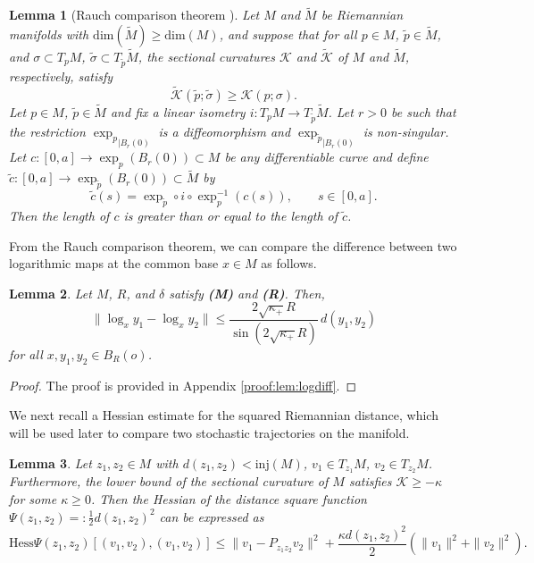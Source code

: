 \documentclass[11pt]{amsart}
\newtheorem{lemma}{Lemma}[section]
\newcommand{\p}{o}%
\newcommand{\dist}{d}%
\newcommand{\inj}{\mathrm{inj}}%
\newcommand{\secc}{\mathcal{K}}%
\begin{document}
\begin{lemma}[Rauch comparison theorem \cite{cheeger1975comparison}]\label{RCT}
Let $M$ and $\tilde{M}$ be Riemannian manifolds with $\mathrm{dim} (\tilde{M})\geq \mathrm{dim}(M)$, and suppose that for all $p\in M$, $\tilde{p}\in \tilde{M}$, and $\sigma\subset T_pM$, $\tilde{\sigma}\subset T_{\tilde{p}}\tilde{M}$, the sectional curvatures $\secc$ and $\tilde{\secc}$ of $M$ and $\tilde{M}$, respectively, satisfy
\[
\tilde{\secc} (\tilde{p};\tilde{\sigma})\geq \secc(p;\sigma).
\]
Let $p\in M$, $\tilde{p}\in\tilde{M}$ and fix a linear isometry $i:T_pM\to T_{\tilde{p}}\tilde{M}$. Let $r>0$ be such that the restriction ${\exp_p}_{|B_r(0)}$ is a diffeomorphism and ${\exp_{\tilde{p}}}_{|B_r(0)}$ is non-singular. Let $c:[0, a]\to\exp_p(B_r(0))\subset M$ be any differentiable curve and define  $\tilde{c}:[0, a]\to\exp_{\tilde{p}}(B_r(0))\subset\tilde{M}$ by
\[
\tilde{c}(s)=\exp_{\tilde{p}}\circ i\circ\exp^{-1}_p(c(s)),\qquad s\in[0, a].
\]  
Then the length of $c$ is greater than or equal to the length of $\tilde{c}$.
\end{lemma}


From the Rauch comparison theorem, we can compare the difference between two logarithmic maps at the common base $x\in M$ as follows.


\begin{lemma}\label{lem:logdiff}
Let $M$, $R$, and $\delta$ satisfy \textbf{(M)} and \textbf{(R)}. Then,
\[
\|\log_x y_1-\log_x y_2\|
\le
\frac{2\sqrt{\kappa_+}R}{\sin(2\sqrt{\kappa_+}R)}\,\dist(y_1,y_2)
\]
for all $x, y_1, y_2\in B_R(\p)$.
\end{lemma}

\begin{proof}
The proof is provided in Appendix \ref{proof:lem:logdiff}.
\end{proof}


We next recall a Hessian estimate for the squared Riemannian distance, which will be used later to compare two stochastic trajectories on the manifold.

\begin{lemma}\label{lem:hessian}
Let $z_1, z_2\in M$ with $\dist(z_1, z_2)<\inj(M)$, $v_1\in T_{z_1}M$, $v_2\in T_{z_2}M$. Furthermore, the lower bound of the sectional curvature of $M$ satisfies $\mathcal K\geq-\kappa$ for some $\kappa\geq0$. Then the Hessian of the distance square function $\Psi(z_1, z_2)=:\frac{1}{2}\dist(z_1, z_2)^2$ can be expressed as
\[
\mathrm{Hess}\Psi(z_1, z_2)[(v_1, v_2), (v_1, v_2)]\leq\|v_1-P_{z_1z_2}v_2\|^2+\frac{\kappa \dist(z_1, z_2)^2}{2}\left(\|v_1\|^2+\|v_2\|^2\right).
\]
\end{lemma}
\end{document}
